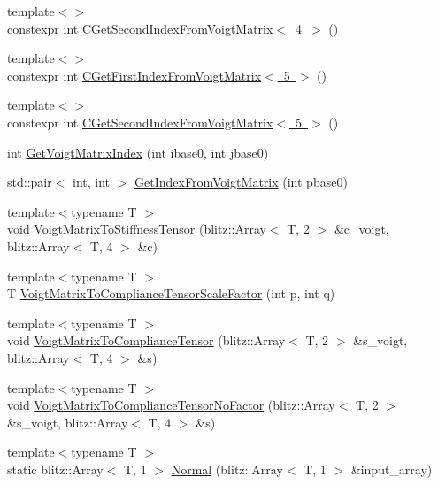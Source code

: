 \begin{DoxyCompactItemize}
\item 
{\footnotesize template$<$$>$ }\\constexpr int \mbox{\hyperlink{namespacempc_1_1utilities_a2e002bb3ea9c528659336d38b86cbaf8}{C\+Get\+Second\+Index\+From\+Voigt\+Matrix$<$ 4 $>$}} ()
\item 
{\footnotesize template$<$$>$ }\\constexpr int \mbox{\hyperlink{namespacempc_1_1utilities_a84defb8639ca919a8620092ce15ffd4c}{C\+Get\+First\+Index\+From\+Voigt\+Matrix$<$ 5 $>$}} ()
\item 
{\footnotesize template$<$$>$ }\\constexpr int \mbox{\hyperlink{namespacempc_1_1utilities_a070e4f2163645cfbe7e03651d594016e}{C\+Get\+Second\+Index\+From\+Voigt\+Matrix$<$ 5 $>$}} ()
\item 
int \mbox{\hyperlink{namespacempc_1_1utilities_ab6036c49506f59bdc9d5e522df98f24a}{Get\+Voigt\+Matrix\+Index}} (int ibase0, int jbase0)
\item 
std\+::pair$<$ int, int $>$ \mbox{\hyperlink{namespacempc_1_1utilities_a3068edcfc9812e8161b332a659ededaa}{Get\+Index\+From\+Voigt\+Matrix}} (int pbase0)
\item 
{\footnotesize template$<$typename T $>$ }\\void \mbox{\hyperlink{namespacempc_1_1utilities_ad181e7080d74d1e523e872bc8ff53f5e}{Voigt\+Matrix\+To\+Stiffness\+Tensor}} (blitz\+::\+Array$<$ T, 2 $>$ \&c\+\_\+voigt, blitz\+::\+Array$<$ T, 4 $>$ \&c)
\item 
{\footnotesize template$<$typename T $>$ }\\T \mbox{\hyperlink{namespacempc_1_1utilities_afd7cbb4c9bcff1896e7151eae95369ae}{Voigt\+Matrix\+To\+Compliance\+Tensor\+Scale\+Factor}} (int p, int q)
\item 
{\footnotesize template$<$typename T $>$ }\\void \mbox{\hyperlink{namespacempc_1_1utilities_a14f790d9a892452ed500ba8d7caf0222}{Voigt\+Matrix\+To\+Compliance\+Tensor}} (blitz\+::\+Array$<$ T, 2 $>$ \&s\+\_\+voigt, blitz\+::\+Array$<$ T, 4 $>$ \&s)
\item 
{\footnotesize template$<$typename T $>$ }\\void \mbox{\hyperlink{namespacempc_1_1utilities_af0464cc342675cdd798936b674ceb8a9}{Voigt\+Matrix\+To\+Compliance\+Tensor\+No\+Factor}} (blitz\+::\+Array$<$ T, 2 $>$ \&s\+\_\+voigt, blitz\+::\+Array$<$ T, 4 $>$ \&s)
\item 
{\footnotesize template$<$typename T $>$ }\\static blitz\+::\+Array$<$ T, 1 $>$ \mbox{\hyperlink{namespacempc_1_1utilities_acc0a66ea58c515cc13d5a0a79439c639}{Normal}} (blitz\+::\+Array$<$ T, 1 $>$ \&input\+\_\+array)

\end{DoxyCompactItemize}
